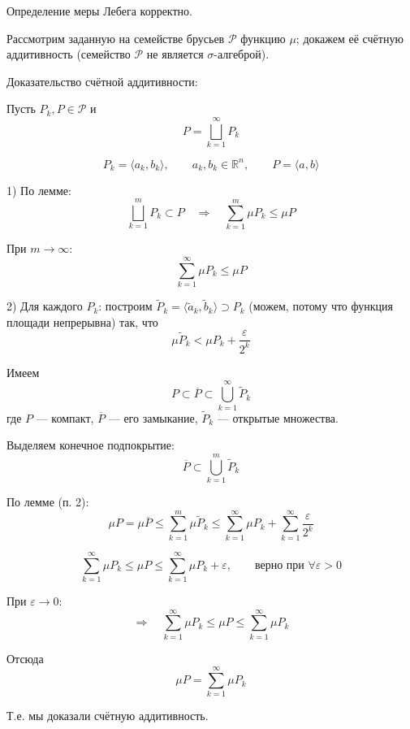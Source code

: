 \documentclass[12pt,a4paper]{article}
\begin{document}
\begin{theorem}{}
    Определение меры Лебега корректно.
\end{theorem}

\begin{proofbox}{}
    Рассмотрим заданную на семействе брусьев $\mathcal P$ функцию $\mu$; докажем её счётную аддитивность (семейство $\mathcal P$ не является $\sigma$-алгеброй).

    Доказательство счётной аддитивности:

    Пусть \(P_k, P \in \mathcal P\) и
    \[
        P=\bigsqcup_{k=1}^{\infty}P_k
    \]

    \[
        P_k=\langle a_k,b_k\rangle,\qquad a_k,b_k\in\mathbb R^n,\qquad P=\langle a,b\rangle
    \]

    1) По лемме:
    \[
        \bigsqcup_{k=1}^{m}P_k\subset P
        \quad\Longrightarrow\quad
        \sum_{k=1}^{m}\mu P_k\leq \mu P
    \]

    При \(m\to\infty\):
    \[
        \sum_{k=1}^{\infty}\mu P_k\leq \mu P
    \]

    2) Для каждого \(P_k\): построим \(\widetilde P_k=\langle \widetilde a_k,\widetilde b_k\rangle\supset P_k\) (можем, потому что функция площади непрерывна) так, что
    \[
        \mu\widetilde P_k<\mu P_k+\frac{\varepsilon}{2^k}
    \]

    Имеем
    \[
    P\subset \overline P\subset \bigcup_{k=1}^{\infty}\widetilde P_k
    \]
    где \(P\) — компакт, \(\overline P\) — его замыкание, \(\widetilde P_k\) — открытые множества.

    Выделяем конечное подпокрытие:
    \[
    \overline P\subset\bigcup_{k=1}^{m}\widetilde P_k
    \]

    По лемме (п. 2):
    \[
    \mu P=\mu\overline P\leq\sum_{k=1}^{m}\mu\widetilde P_k
    \leq
    \sum_{k=1}^{\infty}\mu P_k+\sum_{k=1}^{\infty}\frac{\varepsilon}{2^k}
    \]

    \[
        \sum_{k=1}^{\infty}\mu P_k \leq \mu P \leq \sum_{k=1}^{\infty}\mu P_k+\varepsilon,
        \qquad \text{верно при } \forall \varepsilon>0
    \]

    При \(\varepsilon\to 0\):
    \[
        \Rightarrow\quad
        \sum_{k=1}^{\infty}\mu P_k\leq \mu P\leq\sum_{k=1}^{\infty}\mu P_k
    \]

    Отсюда
    \[
        \mu P=\sum_{k=1}^{\infty}\mu P_k
    \]

    Т.е. мы доказали счётную аддитивность.

\end{proofbox}
\end{document}
